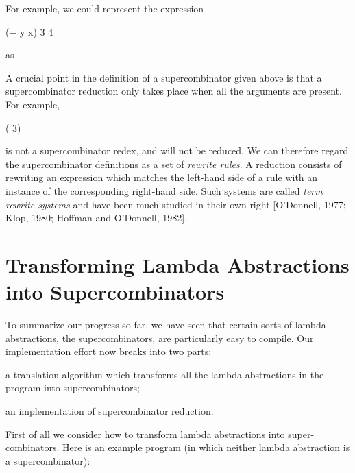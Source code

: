 
\noindent
For example, we could represent the expression
\begin{letalign}
    ($-$ y x) 3 4
\end{letalign}
\noindent
as


A crucial point in the definition of a supercombinator given above is that a
supercombinator reduction only takes place when all the arguments are
present. For example,
\begin{letalign}
    ( 3)
\end{letalign}
is not a supercombinator redex, and will not be reduced. We can therefore
regard the supercombinator definitions as a set of \textit{rewrite rules}. A reduction
consists of rewriting an expression which matches the left-hand side of a rule
with an instance of the corresponding right-hand side. Such systems are called
\textit{term rewrite systems} and have been much studied in their own right
[O'Donnell, 1977; Klop, 1980; Hoffman and O'Donnell, 1982].

\section[Transforming Lambda Abstractions]{Transforming Lambda Abstractions into Supercombinators}

To summarize our progress so far, we have seen that certain sorts of lambda
abstractions, the supercombinators, are particularly easy to compile. Our
implementation effort now breaks into two parts:

\begin{numbered}
    \item a translation algorithm which transforms all the lambda abstractions in
    the program into supercombinators;
    \item an implementation of supercombinator reduction.
\end{numbered}

First of all we consider how to transform lambda abstractions into super-
combinators. Here is an example program (in which neither lambda
abstraction is a supercombinator):


